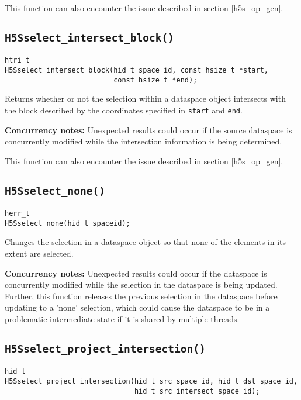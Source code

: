 \documentclass[../HDF5_RFC.tex]{subfiles}
\begin{document}
This function can also encounter the issue described in section \ref{h5s_op_gen}.

\subsection{\texttt{H5Sselect\_intersect\_block()}}
\label{apdx:h5s_func_h5sselect_intersect_block}

\begin{verbatim}
htri_t
H5Sselect_intersect_block(hid_t space_id, const hsize_t *start,
                          const hsize_t *end);
\end{verbatim}

Returns whether or not the selection within a dataspace object intersects with the block described by
the coordinates specified in \texttt{start} and \texttt{end}.

\textbf{Concurrency notes:} Unexpected results could occur if the source dataspace is concurrently
modified while the intersection information is being determined.

This function can also encounter the issue described in section \ref{h5s_op_gen}.

\subsection{\texttt{H5Sselect\_none()}}
\label{apdx:h5s_func_h5sselect_none}

\begin{verbatim}
herr_t
H5Sselect_none(hid_t spaceid);
\end{verbatim}

Changes the selection in a dataspace object so that none of the elements in its extent are selected.

\textbf{Concurrency notes:} Unexpected results could occur if the dataspace is concurrently
modified while the selection in the dataspace is being updated. Further, this function releases
the previous selection in the dataspace before updating to a 'none' selection, which could cause
the dataspace to be in a problematic intermediate state if it is shared by multiple threads.

\subsection{\texttt{H5Sselect\_project\_intersection()}}
\label{apdx:h5s_func_h5sselect_project_intersection}

\begin{verbatim}
hid_t
H5Sselect_project_intersection(hid_t src_space_id, hid_t dst_space_id,
                               hid_t src_intersect_space_id);
\end{verbatim}
\end{document}
